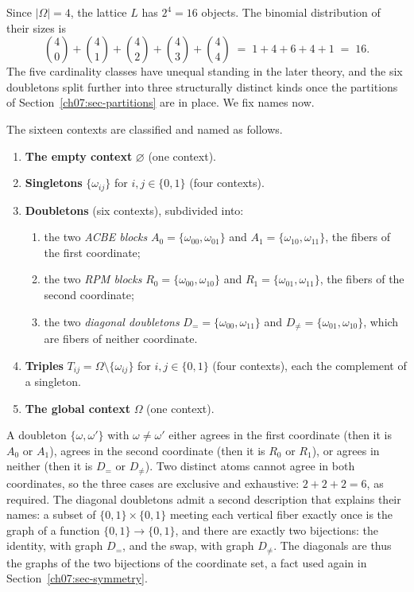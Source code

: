 Since $|\Omega|=4$, the lattice $L$ has $2^{4}=16$ objects. The binomial distribution of their sizes is
\[
\binom{4}{0}+\binom{4}{1}+\binom{4}{2}+\binom{4}{3}+\binom{4}{4}
\;=\;1+4+6+4+1\;=\;16 .
\]
The five cardinality classes have unequal standing in the later theory, and the six doubletons split further into three structurally distinct kinds once the partitions of Section~\ref{ch07:sec-partitions} are in place. We fix names now.

\begin{definition}\label{ch07:def-classes}
The sixteen contexts are classified and named as follows.
\begin{enumerate}
\item \textbf{The empty context} $\varnothing$ (one context).
\item \textbf{Singletons} $\{\omega_{ij}\}$ for $i,j\in\{0,1\}$ (four contexts).
\item \textbf{Doubletons} (six contexts), subdivided into:
  \begin{enumerate}
  \item the two \emph{ACBE blocks} $A_{0}=\{\omega_{00},\omega_{01}\}$ and $A_{1}=\{\omega_{10},\omega_{11}\}$, the fibers of the first coordinate;
  \item the two \emph{RPM blocks} $R_{0}=\{\omega_{00},\omega_{10}\}$ and $R_{1}=\{\omega_{01},\omega_{11}\}$, the fibers of the second coordinate;
  \item the two \emph{diagonal doubletons} $D_{=}=\{\omega_{00},\omega_{11}\}$ and $D_{\neq}=\{\omega_{01},\omega_{10}\}$, which are fibers of neither coordinate.
  \end{enumerate}
\item \textbf{Triples} $T_{ij}=\Omega\setminus\{\omega_{ij}\}$ for $i,j\in\{0,1\}$ (four contexts), each the complement of a singleton.
\item \textbf{The global context} $\Omega$ (one context).
\end{enumerate}
\end{definition}

\begin{remark}\label{ch07:rem-doubleton-split}
A doubleton $\{\omega,\omega'\}$ with $\omega\neq\omega'$ either agrees in the first coordinate (then it is $A_{0}$ or $A_{1}$), agrees in the second coordinate (then it is $R_{0}$ or $R_{1}$), or agrees in neither (then it is $D_{=}$ or $D_{\neq}$). Two distinct atoms cannot agree in both coordinates, so the three cases are exclusive and exhaustive: $2+2+2=6$, as required. The diagonal doubletons admit a second description that explains their names: a subset of $\{0,1\}\times\{0,1\}$ meeting each vertical fiber exactly once is the graph of a function $\{0,1\}\to\{0,1\}$, and there are exactly two bijections: the identity, with graph $D_{=}$, and the swap, with graph $D_{\neq}$. The diagonals are thus the graphs of the two bijections of the coordinate set, a fact used again in Section~\ref{ch07:sec-symmetry}.
\end{remark}


